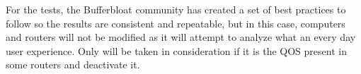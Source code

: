 For the tests, the Bufferbloat community has created a set of best 
practices\cite{tg12} to follow so the results are consistent and repeatable, 
but in this case, computers and routers will not be modified as it will attempt 
to analyze what an every day user experience. Only will be taken in 
consideration if it is the QOS present in some routers and deactivate it.\\
 
